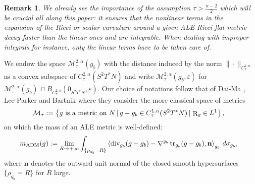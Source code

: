 \documentclass[a4paper,11pt,reqno]{amsart}
\newtheorem{rk}[defn]{Remark}
\def\tr{\mathop{\rm tr}\nolimits}
\def\div{\mathop{\rm div}\nolimits}
\def\tr{\mathop{\rm tr}\nolimits}
\def\div{\mathop{\rm div}\nolimits}
\def\R{\mathop{\rm R}\nolimits}
\numberwithin{equation}{section}
\begin{document}
\begin{rk}	
	We already see the importance of the assumption $\tau>\frac{n-2}{2}$ which will be crucial all along this paper: it ensures that the nonlinear terms in the expansion of the Ricci or scalar curvature around a given ALE Ricci-flat metric decay faster than the linear ones and are integrable. When dealing with improper integrals for instance, 
	only the linear terms have to be taken care of.
	\end{rk}
	We endow the space $\mathcal{M}^{2,\alpha}_{\tau}(g_b)$ with the distance induced by the norm $\|\cdot\|_{C^{2,\alpha}_{\tau}}$ as a convex subspace of $C^{2,\alpha}_{\tau}(S^2T^*N)$ and write $\mathcal{M}^{2,\alpha}_{\tau}(g_b,\varepsilon)$ for $\mathcal{M}^{2,\alpha}_{\tau}(g_b)\,\cap B_{C^{2,\alpha}_{\tau}}(0_{S^2T^*N},\varepsilon).$ 
	Our choice of notations follow that of Dai-Ma \cite{Dai-Ma-Mass}, Lee-Parker \cite{Lee-Parker} and Bartnik \cite{Bart-Mass} where they consider the more classical space of metrics 
	\begin{equation}
	\mathcal{M}_\tau:= \left\{\text{$g$ is a metric on $N$}\,|\, g-g_b\in C^{1,\alpha}_{\tau}(S^2T^*N)\,|\,\R_g \in L^1\right\},
	\end{equation}
	on which the mass of an ALE metric is well-defined:
	\begin{equation}
	m_{\operatorname{ADM}}(g):=\lim_{R\rightarrow+\infty}\int_{\{\rho_{g_b}=R\}}\left<\div_{g_b}(g-g_b)-\nabla^{g_b}\tr_{g_b}(g-g_b),\mathbf{n}\right>_{g_b}\,d\sigma_{g_b},\label{def-mass}
	\end{equation}
	where $\mathbf{n}$ denotes the outward unit normal of the closed smooth hypersurfaces $\{\rho_{g_b}=R\}$ for $R$ large.
	
	
	
	
\end{document}
